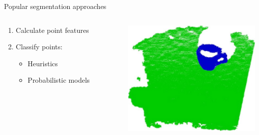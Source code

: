 \documentclass{beamer}
\begin{document}
\begin{frame}{Popular segmentation approaches}

\begin{columns}[T]
\begin{column}{0.5\textwidth}

\begin{enumerate}
\item Calculate point features
\item Classify points:
\begin{itemize}
\item Heuristics
\item Probabilistic models
\end{itemize}
\end{enumerate}

\end{column}

\begin{column}{0.5\textwidth}

\includegraphics[width=1\textwidth]{pics/segmentation.png}

\end{column}

\end{columns}


\end{frame}
\end{document}
